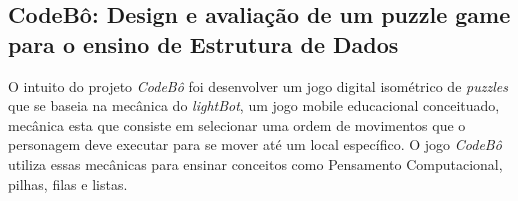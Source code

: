 \subsection{CodeBô: Design e avaliação de um puzzle game para o ensino de Estrutura de Dados}

O intuito do projeto \emph{CodeBô} foi desenvolver um jogo digital isométrico de \emph{puzzles} que se baseia na mecânica do \emph{lightBot}, um jogo mobile educacional conceituado, mecânica esta que consiste em selecionar uma ordem de movimentos que o personagem deve executar para se mover até um local específico. O jogo \emph{CodeBô} utiliza essas mecânicas para ensinar conceitos como Pensamento Computacional, pilhas, filas e listas. \cite{de2025codebo}


